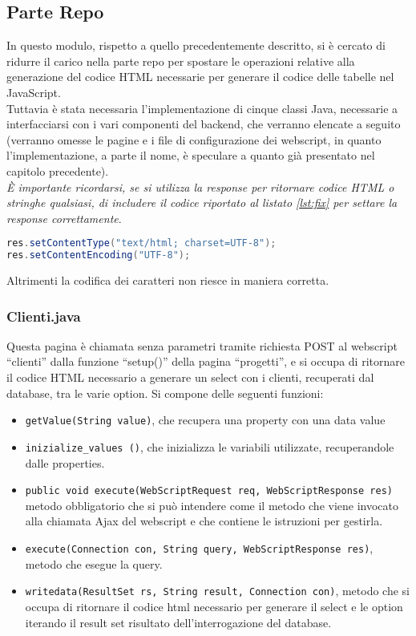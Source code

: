 \subsection{Parte Repo}
In questo modulo, rispetto a quello precedentemente descritto, si è cercato di ridurre il carico nella parte repo per spostare le operazioni relative alla generazione del codice HTML necessarie per generare il codice delle tabelle nel JavaScript.\\
Tuttavia è stata necessaria l’implementazione di cinque classi Java, necessarie a interfacciarsi con i vari componenti del backend, che verranno elencate a seguito (verranno omesse le pagine e i file di configurazione dei webscript, in quanto l'implementazione, a parte il nome, è speculare a quanto già presentato nel capitolo precedente).\\
\emph{È importante ricordarsi, se si utilizza la response per ritornare codice HTML o stringhe qualsiasi, di includere il codice riportato al listato \ref{lst:fix} per settare la response correttamente}.
\begin{lstlisting}[language=Java, caption=set dell'encoding,label=lst:fix]
res.setContentType("text/html; charset=UTF-8");
res.setContentEncoding("UTF-8");
\end{lstlisting}
 Altrimenti la codifica dei caratteri non riesce in maniera corretta.
\subsubsection{Clienti.java}
Questa pagina è chiamata senza parametri tramite richiesta POST al webscript “clienti” dalla funzione “setup()” della pagina “progetti”, e si occupa di ritornare il codice HTML necessario a generare un select con i clienti, recuperati dal database, tra le varie option.
Si compone delle seguenti funzioni:
\begin{itemize}
\item \texttt{getValue(String value)}, che recupera una property con una data value
\item \texttt{inizialize\_values ()}, che inizializza le variabili utilizzate, recuperandole dalle properties.
\item \texttt{public void execute(WebScriptRequest req, WebScriptResponse res)} metodo obbligatorio che si può intendere come il metodo che viene invocato alla chiamata Ajax del webscript e che contiene le istruzioni per gestirla.
\item \texttt{execute(Connection con, String query, WebScriptResponse res)}, metodo che esegue la query.
\item \texttt{writedata(ResultSet rs, String result, Connection con)}, metodo che si occupa di ritornare il codice html necessario per generare il select e le option iterando il result set risultato dell’interrogazione del database.
\end{itemize}
